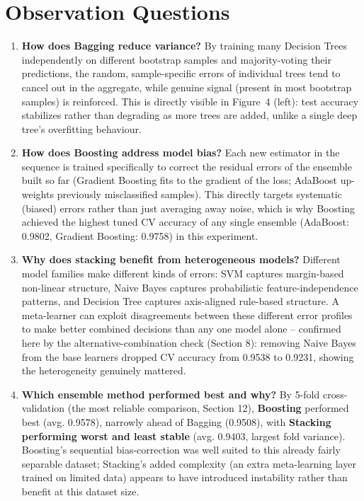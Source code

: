 \documentclass[12pt,a4paper]{article}
\begin{document}
\section{Observation Questions}
\begin{enumerate}
\item \textbf{How does Bagging reduce variance?} By training many Decision Trees
independently on different bootstrap samples and majority-voting their predictions, the
random, sample-specific errors of individual trees tend to cancel out in the aggregate, while
genuine signal (present in most bootstrap samples) is reinforced. This is directly visible in
Figure~4 (left): test accuracy stabilizes rather than degrading as more trees are added,
unlike a single deep tree's overfitting behaviour.
\item \textbf{How does Boosting address model bias?} Each new estimator in the sequence is
trained specifically to correct the residual errors of the ensemble built so far (Gradient
Boosting fits to the gradient of the loss; AdaBoost up-weights previously misclassified
samples). This directly targets systematic (biased) errors rather than just averaging away
noise, which is why Boosting achieved the highest tuned CV accuracy of any single ensemble
(AdaBoost: 0.9802, Gradient Boosting: 0.9758) in this experiment.
\item \textbf{Why does stacking benefit from heterogeneous models?} Different model families
make different kinds of errors: SVM captures margin-based non-linear structure, Naive Bayes
captures probabilistic feature-independence patterns, and Decision Tree captures axis-aligned
rule-based structure. A meta-learner can exploit disagreements between these different error
profiles to make better combined decisions than any one model alone -- confirmed here by the
alternative-combination check (Section 8): removing Naive Bayes from the base learners dropped
CV accuracy from 0.9538 to 0.9231, showing the heterogeneity genuinely mattered.
\item \textbf{Which ensemble method performed best and why?} By 5-fold cross-validation (the
most reliable comparison, Section 12), \textbf{Boosting} performed best (avg. 0.9578),
narrowly ahead of Bagging (0.9508), with \textbf{Stacking performing worst and least stable}
(avg. 0.9403, largest fold variance). Boosting's sequential bias-correction was well suited to
this already fairly separable dataset; Stacking's added complexity (an extra meta-learning
layer trained on limited data) appears to have introduced instability rather than benefit at
this dataset size.
\end{enumerate}
\end{document}
